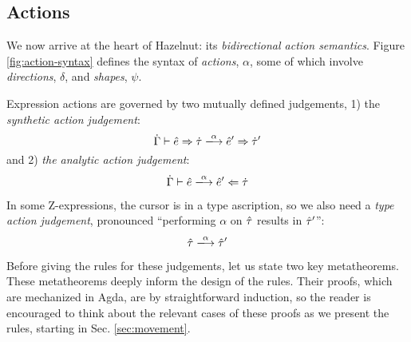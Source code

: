 \subsection{Actions}\label{sec:actions}


We now arrive at the heart of Hazelnut: its \emph{bidirectional action semantics}.  
Figure \ref{fig:action-syntax} defines the syntax of \emph{actions}, $\alpha$, some of which involve \emph{directions}, $\delta$, and \emph{shapes}, $\psi$. 

Expression actions are governed by two mutually defined judgements, 1) the \emph{synthetic action judgement}:
\[
\performSyn{\hGamma}{\zexp}{\htau}{\alpha}{\zexp'}{\htau'}
\]
and 2) \emph{the analytic action judgement}:
\[
\performAna{\hGamma}{\zexp}{\htau}{\alpha}{\zexp'}
\]

In some Z-expressions, the cursor is in a type ascription, so we also need a \emph{type action judgement}, pronounced ``performing $\alpha$ on $\hat{\tau}$ results in $\hat{\tau}'$'':
\[
\performTyp{\ztau}{\alpha}{\ztau'}
\]


Before giving the rules for these judgements, let us state two key metatheorems. These metatheorems deeply inform the design of the rules. Their proofs, which are mechanized in Agda, are by straightforward induction, so the reader is encouraged to think about the relevant cases of these proofs as we present the rules, starting in Sec. \ref{sec:movement}.

